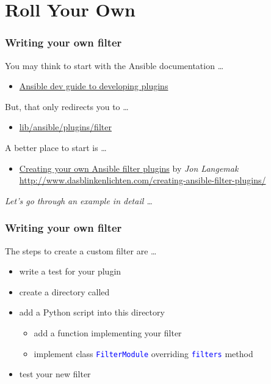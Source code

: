 \documentclass[pdf]{beamer}
\begin{document}
\section{Roll Your Own}

\begin{frame}
  \frametitle{Writing your own filter}
  You may think to start with the Ansible documentation \ldots
  \begin{itemize}
    \item \href{http://docs.ansible.com/ansible/dev_guide/developing_plugins.html}{Ansible dev guide to developing plugins}
  \end{itemize}
  \pause
  But, that only redirects you to \ldots
  \begin{itemize}
    \item \href{https://github.com/ansible/ansible/blob/devel/lib/ansible/plugins/filter/core.py}{lib/ansible/plugins/filter}
  \end{itemize}
  \pause
  A better place to start is \ldots
  \begin{itemize}
    \item
      \href{http://www.dasblinkenlichten.com/creating-ansible-filter-plugins/}{Creating
      your own Ansible filter plugins} by \textit{Jon Langemak}
      \scriptsize \url{http://www.dasblinkenlichten.com/creating-ansible-filter-plugins/}
  \end{itemize}
  \bigskip
  \pause
  \textit{Let's go through an example in detail \ldots}
\end{frame}

\begin{frame}[t,fragile]
  \frametitle{Writing your own filter}
  The steps to create a custom filter are \ldots
  \pause{}
  \begin{itemize}[<+-|alert@+>]
    \item {write a test for your plugin}
    \item {create a directory called }
    \item {add a Python script into this directory}
      \begin{itemize}
        \item {add a function implementing your filter}
        \item {implement class \textcolor{blue}{\texttt{FilterModule}} overriding \textcolor{blue}{\texttt{filters}} method}
      \end{itemize}
    \item {test your new filter}
  \end{itemize}
  \bigskip
\end{frame}
\end{document}
